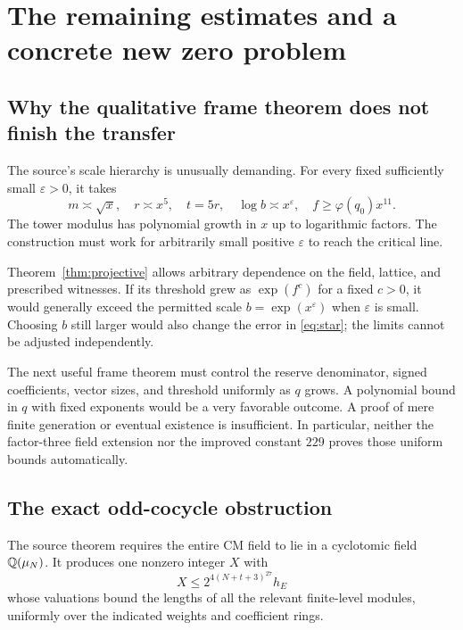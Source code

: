 \section{The remaining estimates and a concrete new zero problem}
\label{sec:remaining}

\subsection{Why the qualitative frame theorem does not finish the transfer}

The source's scale hierarchy is unusually demanding. For every fixed sufficiently small $\varepsilon>0$, it takes
\[
 m\asymp\sqrt x,\quad r\asymp x^5,\quad t=5r,
 \quad \log b\asymp x^\varepsilon,
 \quad f\ge\varphi(q_0)x^{11}.
\]
The tower modulus has polynomial growth in $x$ up to logarithmic factors. The construction must work for arbitrarily small positive $\varepsilon$ to reach the critical line.\cite{guide,oneSided}

Theorem~\ref{thm:projective} allows arbitrary dependence on the field, lattice, and prescribed witnesses. If its threshold grew as $\exp(f^c)$ for a fixed $c>0$, it would generally exceed the permitted scale $b=\exp(x^\varepsilon)$ when $\varepsilon$ is small. Choosing $b$ still larger would also change the error in \eqref{eq:star}; the limits cannot be adjusted independently.

The next useful frame theorem must control the reserve denominator, signed coefficients, vector sizes, and threshold uniformly as $q$ grows. A polynomial bound in $q$ with fixed exponents would be a very favorable outcome. A proof of mere finite generation or eventual existence is insufficient. In particular, neither the factor-three field extension nor the improved constant $229$ proves those uniform bounds automatically.

\subsection{The exact odd-cocycle obstruction}

The source theorem
requires the entire CM field to lie in a cyclotomic field $\mathbb Q(\mu_N)$. It produces one nonzero integer $X$ with
\begin{equation}\label{eq:odd-source}
 X\le 2^{4(N+t+3)^{27}}h_E
\end{equation}
whose valuations bound the lengths of all the relevant finite-level modules, uniformly over the indicated weights and coefficient rings.\cite{oddSha}

